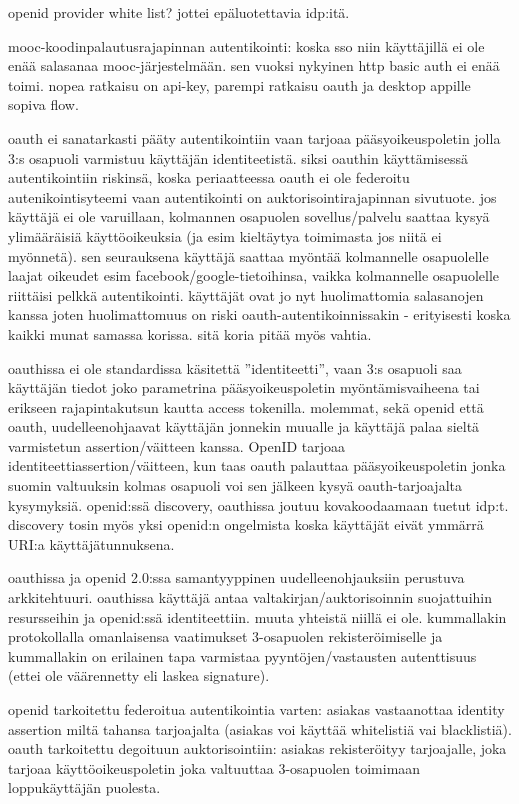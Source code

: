 \documentclass[finnish,gradu]{tktltiki}
\begin{document}
  openid provider white list? jottei epäluotettavia idp:itä.

  mooc-koodinpalautusrajapinnan autentikointi: koska sso niin käyttäjillä ei ole enää salasanaa mooc-järjestelmään. sen vuoksi nykyinen http basic auth ei enää toimi. nopea ratkaisu on api-key, parempi ratkaisu oauth ja desktop appille sopiva flow.

  oauth ei sanatarkasti pääty autentikointiin vaan tarjoaa pääsyoikeuspoletin jolla 3:s osapuoli varmistuu käyttäjän identiteetistä. siksi oauthin käyttämisessä autentikointiin riskinsä, koska periaatteessa oauth ei ole federoitu autenikointisyteemi vaan autentikointi on auktorisointirajapinnan sivutuote. jos käyttäjä ei ole varuillaan, kolmannen osapuolen sovellus/palvelu saattaa kysyä ylimääräisiä käyttöoikeuksia (ja esim kieltäytya toimimasta jos niitä ei myönnetä). sen seurauksena käyttäjä saattaa myöntää kolmannelle osapuolelle laajat oikeudet esim facebook/google-tietoihinsa, vaikka kolmannelle osapuolelle riittäisi pelkkä autentikointi. käyttäjät ovat jo nyt huolimattomia salasanojen kanssa joten huolimattomuus on riski oauth-autentikoinnissakin - erityisesti koska kaikki munat samassa korissa. sitä koria pitää myös vahtia.

  oauthissa ei ole standardissa käsitettä ''identiteetti'', vaan 3:s osapuoli saa käyttäjän tiedot joko parametrina pääsyoikeuspoletin myöntämisvaiheena tai erikseen rajapintakutsun kautta access tokenilla.
  molemmat, sekä openid että oauth, uudelleenohjaavat käyttäjän jonnekin muualle ja käyttäjä palaa sieltä varmistetun assertion/väitteen kanssa. OpenID tarjoaa identiteettiassertion/väitteen, kun taas oauth palauttaa pääsyoikeuspoletin jonka suomin valtuuksin kolmas osapuoli voi sen jälkeen kysyä oauth-tarjoajalta kysymyksiä. openid:ssä discovery, oauthissa joutuu kovakoodaamaan tuetut idp:t. discovery tosin myös yksi openid:n ongelmista koska käyttäjät eivät ymmärrä URI:a käyttäjätunnuksena.

  oauthissa ja openid 2.0:ssa samantyyppinen uudelleenohjauksiin perustuva arkkitehtuuri. oauthissa käyttäjä antaa valtakirjan/auktorisoinnin suojattuihin resursseihin ja openid:ssä identiteettiin. muuta yhteistä niillä ei ole. kummallakin protokollalla omanlaisensa vaatimukset 3-osapuolen rekisteröimiselle ja kummallakin on erilainen tapa varmistaa pyyntöjen/vastausten autenttisuus (ettei ole väärennetty eli laskea signature).

  openid tarkoitettu federoitua autentikointia varten: asiakas vastaanottaa identity assertion miltä tahansa tarjoajalta (asiakas voi käyttää whitelistiä vai blacklistiä).
  oauth tarkoitettu degoituun auktorisointiin: asiakas rekisteröityy tarjoajalle, joka tarjoaa käyttöoikeuspoletin joka valtuuttaa 3-osapuolen toimimaan loppukäyttäjän puolesta.
\end{document}
